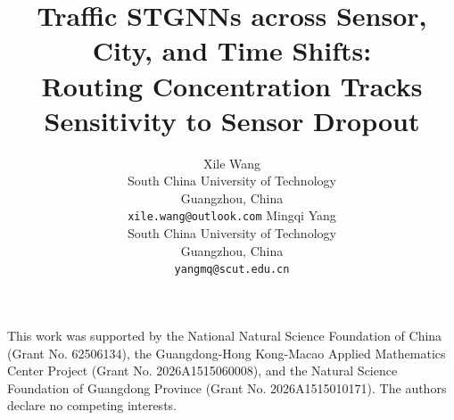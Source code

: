 \documentclass{article}
\title{Traffic STGNNs across Sensor, City, and Time Shifts:\\
       Routing Concentration Tracks\\
       Sensitivity to Sensor Dropout}
\author{%
  Xile Wang \\
  South China University of Technology \\
  Guangzhou, China \\
  \texttt{xile.wang@outlook.com}
  \And
  Mingqi Yang \\
  South China University of Technology \\
  Guangzhou, China \\
  \texttt{yangmq@scut.edu.cn}
}
\begin{document}
\maketitle

\begin{abstract}

\end{abstract}









\clearpage
\begin{ack}
This work was supported by the National Natural Science Foundation of China (Grant No. 62506134), the Guangdong-Hong Kong-Macao Applied Mathematics Center Project (Grant No. 2026A1515060008), and the Natural Science Foundation of Guangdong Province (Grant No. 2026A1515010171).
The authors declare no competing interests.
\end{ack}






\clearpage

\end{document}

